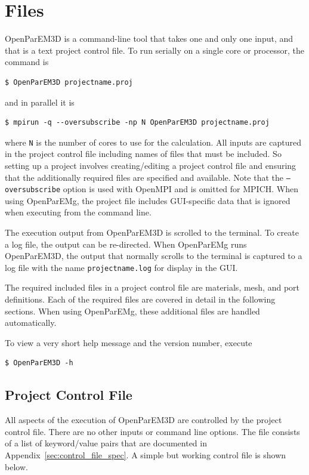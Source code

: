\documentclass[titlepage]{article}
\renewcommand\_{\textunderscore\linebreak[1]}
\begin{document}
\section{Files}
\label{sec:files}

OpenParEM3D is a command-line tool that takes one and only one input, and that is a text project control file.  To run serially on a single core or processor, the command is
\begin{Verbatim}[fontsize=\small]
   $ OpenParEM3D projectname.proj
\end{Verbatim}
and in parallel it is
\begin{Verbatim}[fontsize=\small]
   $ mpirun -q --oversubscribe -np N OpenParEM3D projectname.proj
\end{Verbatim}
where \verb+N+ is the number of cores to use for the calculation.  All inputs are captured in the project control file including names of files that must be included. So setting up a project involves creating/editing a project control file and ensuring that the additionally required files are specified and available.  Note that the \texttt{--oversubscribe} option is used with OpenMPI\cite{OpenMPI} and is omitted for MPICH\cite{MPICH}.  
When using OpenParEMg, the project file includes GUI-specific data that is ignored when executing from the command line.

The execution output from OpenParEM3D is scrolled to the terminal.  To create a log file, the output can be re-directed.  When OpenParEMg runs OpenParEM3D, the output that normally scrolls to the terminal is captured to a log file with the name \texttt{projectname.log} for display in the GUI.

The required included files in a project control file are materials, mesh, and port definitions. Each of the required files are covered in detail in the following sections.  When using OpenParEMg, these additional files are handled automatically.

To view a very short help message and the version number, execute
\begin{Verbatim}[fontsize=\small]
   $ OpenParEM3D -h
\end{Verbatim}

\subsection{Project Control File}

All aspects of the execution of OpenParEM3D are controlled by the project control file.  There are no other inputs or command line options.  The file consists of a list of keyword/value pairs that are documented in Appendix~\ref{sec:control_file_spec}.  A simple but working control file is shown below.
\end{document}
